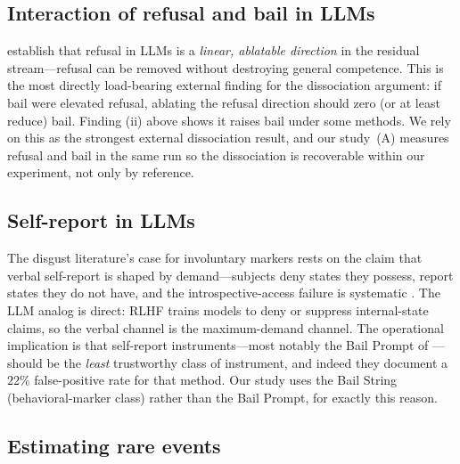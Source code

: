 \documentclass{article}
\begin{document}
\subsection{Interaction of refusal and bail in LLMs}

\citet{arditi2024refusal} establish that refusal in LLMs is a \emph{linear,
ablatable direction} in the residual stream---refusal can be removed without
destroying general competence. This is the most directly load-bearing external
finding for the dissociation argument: if bail were elevated refusal,
ablating the refusal direction should zero (or at least reduce) bail. Finding
(ii) above shows it raises bail under some methods. We rely on this as the
strongest external dissociation result, and our study~(A) measures refusal and
bail in the same run so the dissociation is recoverable within our experiment,
not only by reference.

\subsection{Self-report in LLMs}

The disgust literature's case for involuntary markers rests on the claim that
verbal self-report is shaped by demand---subjects deny states they possess,
report states they do not have, and the introspective-access failure is
systematic \citep{nisbett1977telling,bargh1999unbearable}. The LLM analog is
direct: RLHF trains models to deny or suppress internal-state claims, so the
verbal channel is the maximum-demand channel. The operational implication is
that self-report instruments---most notably the Bail Prompt of
\citet{ensign2025bail}---should be the \emph{least} trustworthy class of
instrument, and indeed they document a $22\%$ false-positive rate for that
method. Our study uses the Bail String (behavioral-marker class) rather than
the Bail Prompt, for exactly this reason.

\subsection{Estimating rare events}

\label{sec:related-rare-events}
\end{document}
